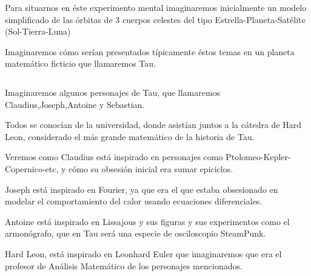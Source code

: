 \documentclass[preview]{standalone}
\begin{document}
\begin{center}
Para situarnos en éste experimento mental imaginaremos inicialmente un modelo simplificado de las órbitas de 3 cuerpos celestes del tipo Estrella-Planeta-Satélite (Sol-Tierra-Luna) 

$$ $$
Imaginaremos cómo serían presentados típicamente éstos temas en un planeta matemático ficticio que llamaremos Tau. 

$$ $$ 

Imaginaremos algunos personajes  de Tau, que llamaremos Claudius,Joseph,Antoine y Sebastian. 

Todos se conocían de la universidad, donde asistían juntos a la cátedra de Hard Leon, considerado el más grande matemático de la historia de Tau.

Veremos como Claudius está inspirado en personajes como Ptolomeo-Kepler-Copernico-etc, y cómo su obsesión inicial era sumar epiciclos.  

Joseph está inspirado en Fourier, ya que era el que estaba obsesionado en modelar el comportamiento del calor usando ecuaciones diferenciales.  

Antoine está inspirado en Lissajous y sus figuras y sus experimentos como el armonógrafo, que en Tau será una especie de osciloscopio SteamPunk.

Hard Leon, está inspirado en Leonhard Euler que imaginaremos que era el profesor de Análisis Matemático de los personajes mencionados.

$$ $$
\end{center}
\end{document}
